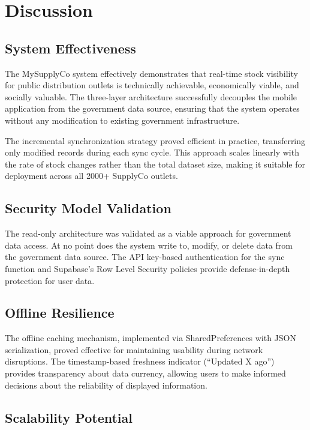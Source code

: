 \section{Discussion}

\subsection{System Effectiveness}

The MySupplyCo system effectively demonstrates that real-time stock visibility for public distribution outlets is technically achievable, economically viable, and socially valuable. The three-layer architecture successfully decouples the mobile application from the government data source, ensuring that the system operates without any modification to existing government infrastructure.

The incremental synchronization strategy proved efficient in practice, transferring only modified records during each sync cycle. This approach scales linearly with the rate of stock changes rather than the total dataset size, making it suitable for deployment across all 2000+ SupplyCo outlets.

\subsection{Security Model Validation}

The read-only architecture was validated as a viable approach for government data access. At no point does the system write to, modify, or delete data from the government data source. The API key-based authentication for the sync function and Supabase's Row Level Security policies provide defense-in-depth protection for user data.

\subsection{Offline Resilience}

The offline caching mechanism, implemented via SharedPreferences with JSON serialization, proved effective for maintaining usability during network disruptions. The timestamp-based freshness indicator (``Updated X ago'') provides transparency about data currency, allowing users to make informed decisions about the reliability of displayed information.

\subsection{Scalability Potential}

